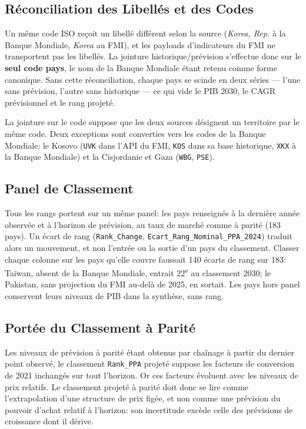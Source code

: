 \documentclass[11pt,a4paper]{article}
\begin{document}
\subsection{Réconciliation des Libellés et des Codes}
Un même code ISO reçoit un libellé différent selon la source (\textit{Korea, Rep.} à la Banque Mondiale, \textit{Korea} au FMI), et les payloads d'indicateurs du FMI ne transportent pas les libellés. La jointure historique/prévision s'effectue donc sur le \textbf{seul code pays}, le nom de la Banque Mondiale étant retenu comme forme canonique. Sans cette réconciliation, chaque pays se scinde en deux séries — l'une sans prévision, l'autre sans historique — ce qui vide le PIB 2030, le CAGR prévisionnel et le rang projeté.

La jointure sur le code suppose que les deux sources désignent un territoire par le même code. Deux exceptions sont converties vers les codes de la Banque Mondiale: le Kosovo (\texttt{UVK} dans l'API du FMI, \texttt{KOS} dans sa base historique, \texttt{XKX} à la Banque Mondiale) et la Cisjordanie et Gaza (\texttt{WBG}, \texttt{PSE}).

\subsection{Panel de Classement}
Tous les rangs portent sur un même panel: les pays renseignés à la dernière année observée et à l'horizon de prévision, au taux de marché comme à parité (183 pays). Un écart de rang (\texttt{Rank\_Change}, \texttt{Ecart\_Rang\_Nominal\_PPA\_2024}) traduit alors un mouvement, et non l'entrée ou la sortie d'un pays du classement. Classer chaque colonne sur les pays qu'elle couvre faussait 140 écarts de rang sur 183: Taïwan, absent de la Banque Mondiale, entrait 22\textsuperscript{e} au classement 2030; le Pakistan, sans projection du FMI au-delà de 2025, en sortait. Les pays hors panel conservent leurs niveaux de PIB dans la synthèse, sans rang.

\subsection{Portée du Classement à Parité}
Les niveaux de prévision à parité étant obtenus par chaînage à partir du dernier point observé, le classement \texttt{Rank\_PPA} projeté suppose les facteurs de conversion de 2021 inchangés sur tout l'horizon. Or ces facteurs évoluent avec les niveaux de prix relatifs. Le classement projeté à parité doit donc se lire comme l'extrapolation d'une structure de prix figée, et non comme une prévision du pouvoir d'achat relatif à l'horizon: son incertitude excède celle des prévisions de croissance dont il dérive.
\end{document}
